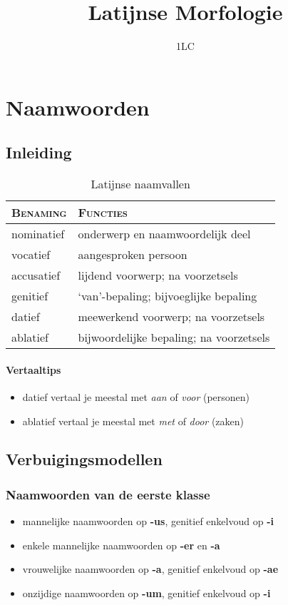 \documentclass[12pt,a4paper]{article}
\title{Latijnse Morfologie}
\author{1LC}
\date{}
\begin{document}
\maketitle

\section{Naamwoorden}

\subsection{Inleiding}

\begin{table}[H]
\centering
\begin{tabular}{ll}
\toprule
\textsc{Benaming} & \textsc{Functies} \\
\midrule
nominatief & onderwerp en naamwoordelijk deel \\
vocatief   & aangesproken persoon \\
accusatief & lijdend voorwerp; na voorzetsels \\
genitief   & `van'-bepaling; bijvoeglijke bepaling \\
datief     & meewerkend voorwerp; na voorzetsels \\
ablatief   & bijwoordelijke bepaling; na voorzetsels \\
\bottomrule
\end{tabular}
\caption{Latijnse naamvallen}
\label{tab:naamval}
\end{table}

\paragraph{Vertaaltips}
\begin{itemize}
    \item datief vertaal je meestal met \emph{aan} of \emph{voor} (personen)
    \item ablatief vertaal je meestal met \emph{met} of \emph{door} (zaken)
\end{itemize}


\subsection{Verbuigingsmodellen}

\subsubsection{Naamwoorden van de eerste klasse}
\begin{itemize}
    \item mannelijke naamwoorden op \textbf{-us}, genitief enkelvoud op \textbf{-i}
    \item enkele mannelijke naamwoorden op \textbf{-er} en \textbf{-a}
    \item vrouwelijke naamwoorden op \textbf{-a}, genitief enkelvoud op \textbf{-ae}
    \item onzijdige naamwoorden op \textbf{-um}, genitief enkelvoud op \textbf{-i}
\end{itemize}
\end{document}
